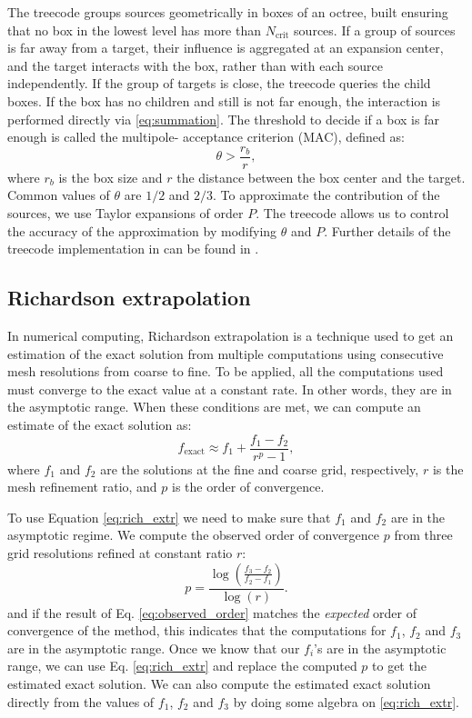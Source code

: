 The treecode groups sources geometrically in boxes of an octree, built ensuring
that no box in the lowest level has more than $N_\text{crit}$ sources. If a group of
sources is far away from a target, their influence is aggregated at an expansion center,
and the target interacts with the box, rather than with each source independently. If the group of targets is close, 
the treecode queries the child boxes. If the box has no children and still is not far enough, the interaction is 
performed directly via \eqref{eq:summation}. The threshold to decide if a box is far enough is called the multipole-
acceptance criterion (MAC), defined as:
%
\begin{equation}
\theta > \frac{r_b}{r},
\end{equation}
%
where $r_b$ is the box size and $r$ the distance between the box center and the target.
Common values of $\theta$ are $1/2$ and $2/3$.
To approximate the contribution of the sources, we use Taylor expansions
of order $P$.
The treecode allows us to control the accuracy of the approximation by modifying $\theta$ and $P$.
Further details of the treecode implementation in \pygbe can be found in \cite{CooperBarba-share154331,CooperBardhanBarba2013}.

\subsection{Richardson extrapolation} \label{sec:rich_extrapolation}

In numerical computing, Richardson extrapolation is a technique used to get an estimation
of the exact solution from multiple computations using consecutive mesh resolutions from coarse
to fine. To be applied, all the computations used must converge to the exact value
at a constant rate. In other words, they are in the asymptotic range. When these conditions are met,
we can compute an estimate of the exact solution as:
%
\begin{equation} \label{eq:rich_extr}
   f_{\text{exact}} \approx f_1 + \frac{f_1 - f_2}{r^{p} - 1},
\end{equation} 
%
where $f_1$ and $f_2$ are the solutions at the fine and coarse grid, respectively, 
$r$ is the mesh refinement ratio, and $p$ is the order of convergence.

To use Equation \eqref{eq:rich_extr} we need to make sure that $f_1$ and $f_2$ are in the 
asymptotic regime. We compute the observed order of convergence $p$ from three grid resolutions
refined at constant ratio $r$:
%
\begin{equation} \label{eq:observed_order}
   p = \frac{\log \left( \frac{f_3 - f_2}{f_2-f_1} \right)}{\log (r)}.
\end{equation}
%   
and if the result of Eq. \eqref{eq:observed_order} matches the \textit{expected} order of convergence
of the method, this indicates that the computations for $f_1$, $f_2$ and $f_3$ are in the asymptotic range.
Once we know that our $f_i$'s are in the asymptotic range, we can use Eq. \eqref{eq:rich_extr} and replace
the computed $p$ to get the estimated exact solution. We can also compute the estimated exact solution
directly from the values of $f_1$, $f_2$ and $f_3$ by doing some algebra on \eqref{eq:rich_extr}.

